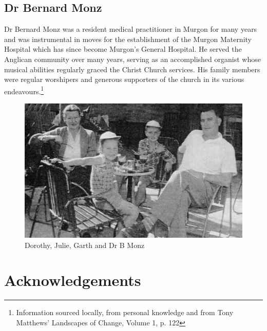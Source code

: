 \section{Dr Bernard Monz}



Dr Bernard Monz was a resident medical practitioner in Murgon for many years and was instrumental in moves for the establishment of the Murgon Maternity Hospital which has since become Murgon's General Hospital. He served the Anglican community over many years, serving as an accomplished organist whose musical abilities regularly graced the Christ Church services. His family members were regular worshipers and generous supporters of the church in its various endeavours.\footnote{Information sourced locally, from personal knowledge and from Tony Matthews' Landscapes of Change, Volume 1, p. 122}








\begin{figure}
\begin{center}
\includegraphics[width=1.\linewidth,center]{../images/monz.jpg}
\caption{Dorothy, Julie, Garth and Dr B Monz}
\end{center}
\end{figure}


\balance


\printendnotes[custom]
\setcounter{endnote}{0}
\chapter{Acknowledgements}
\nobalance








